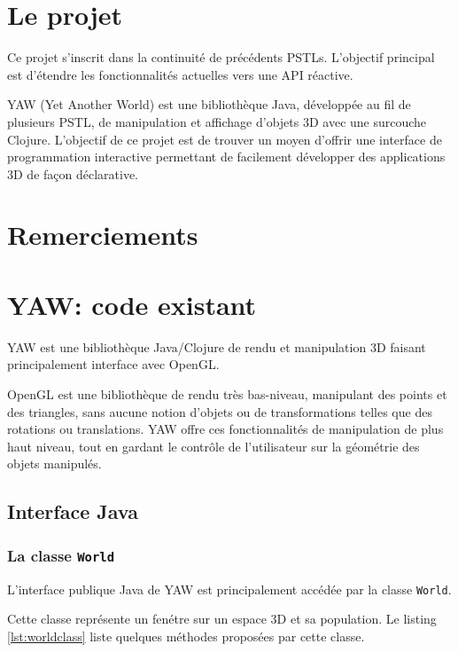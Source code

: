 \documentclass{report}
\begin{document}


\tableofcontents

\chapter{Le projet}

Ce projet s'inscrit dans la continuité de précédents PSTLs. L'objectif
principal est d'étendre les fonctionnalités actuelles vers une API réactive.

YAW (Yet Another World) est une bibliothèque Java, développée au fil de plusieurs
PSTL, de manipulation et affichage d'objets 3D avec une surcouche Clojure.
L'objectif de ce projet est de trouver un moyen d'offrir une interface de
programmation interactive permettant de facilement développer des applications
3D de façon déclarative.

\chapter{Remerciements}

\chapter{YAW: code existant}

YAW est une bibliothèque Java/Clojure de rendu et manipulation 3D faisant principalement
interface avec OpenGL.

OpenGL est une bibliothèque de rendu très bas-niveau,
manipulant des points et des triangles, sans aucune notion d'objets ou de
transformations telles que des rotations ou translations.
YAW offre ces fonctionnalités de manipulation de plus haut niveau, tout en
gardant le contrôle de l'utilisateur sur la géométrie des objets manipulés.

\section{Interface Java}

\subsection{La classe \lstinline|World|}
L'interface publique Java de YAW est principalement accédée par la classe
\lstinline|World|.

Cette classe représente un fenétre sur un espace 3D et sa population.
Le listing \ref{lst:worldclass} liste quelques méthodes proposées par cette
classe.
\end{document}
